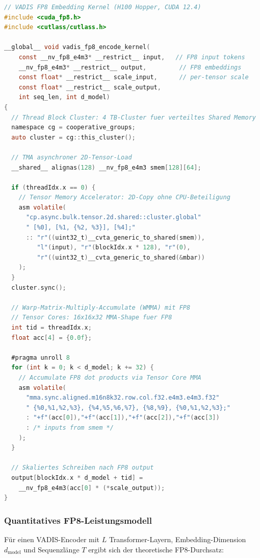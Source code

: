 ﻿\documentclass[12pt,a4paper]{article}
\begin{document}
\begin{lstlisting}[language=C, caption={FP8-Transformer-Engine-Kernel für VADIS Encoder-Inferenz (CUDA 12.4)}]
// VADIS FP8 Embedding Kernel (H100 Hopper, CUDA 12.4)
#include <cuda_fp8.h>
#include <cutlass/cutlass.h>

__global__ void vadis_fp8_encode_kernel(
    const __nv_fp8_e4m3* __restrict__ input,   // FP8 input tokens
    __nv_fp8_e4m3* __restrict__ output,         // FP8 embeddings
    const float* __restrict__ scale_input,      // per-tensor scale
    const float* __restrict__ scale_output,
    int seq_len, int d_model)
{
  // Thread Block Cluster: 4 TB-Cluster fuer verteiltes Shared Memory
  namespace cg = cooperative_groups;
  auto cluster = cg::this_cluster();
  
  // TMA asynchroner 2D-Tensor-Load
  __shared__ alignas(128) __nv_fp8_e4m3 smem[128][64];
  
  if (threadIdx.x == 0) {
    // Tensor Memory Accelerator: 2D-Copy ohne CPU-Beteiligung
    asm volatile(
      "cp.async.bulk.tensor.2d.shared::cluster.global"
      " [%0], [%1, {%2, %3}], [%4];"
      :: "r"((uint32_t)__cvta_generic_to_shared(smem)),
         "l"(input), "r"(blockIdx.x * 128), "r"(0),
         "r"((uint32_t)__cvta_generic_to_shared(&mbar))
    );
  }
  cluster.sync();
  
  // Warp-Matrix-Multiply-Accumulate (WMMA) mit FP8
  // Tensor Cores: 16x16x32 MMA-Shape fuer FP8
  int tid = threadIdx.x;
  float acc[4] = {0.0f};
  
  #pragma unroll 8
  for (int k = 0; k < d_model; k += 32) {
    // Accumulate FP8 dot products via Tensor Core MMA
    asm volatile(
      "mma.sync.aligned.m16n8k32.row.col.f32.e4m3.e4m3.f32"
      " {%0,%1,%2,%3}, {%4,%5,%6,%7}, {%8,%9}, {%0,%1,%2,%3};"
      : "+f"(acc[0]),"+f"(acc[1]),"+f"(acc[2]),"+f"(acc[3])
      : /* inputs from smem */
    );
  }
  
  // Skaliertes Schreiben nach FP8 output
  output[blockIdx.x * d_model + tid] = 
    __nv_fp8_e4m3(acc[0] * (*scale_output));
}
\end{lstlisting}

\subsubsection{Quantitatives FP8-Leistungsmodell}

Für einen VADIS-Encoder mit $L$ Transformer-Layern,
Embedding-Dimension $d_{\text{model}}$ und Sequenzlänge $T$
ergibt sich der theoretische FP8-Durchsatz:
\end{document}
